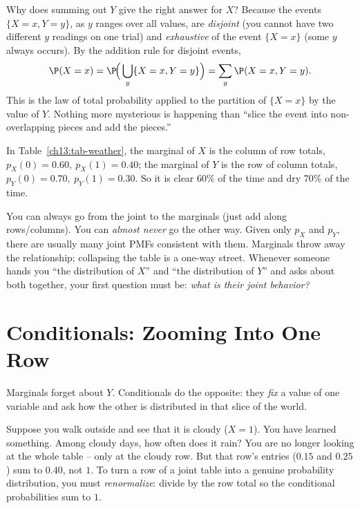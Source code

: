 \begin{whybox}
Why does summing out $Y$ give the right answer for $X$? Because the events
$\{X=x, Y=y\}$, as $y$ ranges over all values, are \emph{disjoint} (you cannot
have two different $y$ readings on one trial) and \emph{exhaustive} of the event
$\{X=x\}$ (some $y$ always occurs). By the addition rule for disjoint events,
\[
  \P(X=x) = \P\!\Big(\bigcup_y \{X=x, Y=y\}\Big)
          = \sum_y \P(X=x, Y=y).
\]
This is the law of total probability applied to the partition of $\{X=x\}$ by the
value of $Y$. Nothing more mysterious is happening than ``slice the event into
non-overlapping pieces and add the pieces.''
\end{whybox}

In Table~\ref{ch13:tab-weather}, the marginal of $X$ is the column of row totals,
$p_X(0)=0.60,\ p_X(1)=0.40$; the marginal of $Y$ is the row of column totals,
$p_Y(0)=0.70,\ p_Y(1)=0.30$. So it is clear $60\%$ of the time and dry $70\%$ of
the time.

\begin{trapbox}
You can always go from the joint to the marginals (just add along rows/columns).
You can \emph{almost never} go the other way. Given only $p_X$ and $p_Y$, there
are usually many joint PMFs consistent with them. Marginals throw away the
relationship; collapsing the table is a one-way street. Whenever someone hands
you ``the distribution of $X$'' and ``the distribution of $Y$'' and asks about
both together, your first question must be: \emph{what is their joint behavior?}
\end{trapbox}

\section{Conditionals: Zooming Into One Row}
\label{ch13:conditionals}

Marginals forget about $Y$. Conditionals do the opposite: they \emph{fix} a value
of one variable and ask how the other is distributed in that slice of the world.

\begin{intuitionbox}
Suppose you walk outside and see that it is cloudy ($X=1$). You have learned
something. Among cloudy days, how often does it rain? You are no longer looking
at the whole table -- only at the cloudy row. But that row's entries
($0.15$ and $0.25$) sum to $0.40$, not $1$. To turn a row of a joint table into a
genuine probability distribution, you must \emph{renormalize}: divide by the row
total so the conditional probabilities sum to $1$.
\end{intuitionbox}

